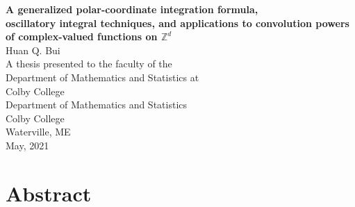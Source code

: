 \documentclass[11pt, letter]{book}
\begin{document}
\thispagestyle{empty}
\begin{center}
{\Large{\textbf{
A generalized polar-coordinate integration formula, \\
oscillatory integral techniques, and applications to convolution powers of complex-valued functions on $\mathbb{Z}^d$
}}}\\
\vspace{1cm}
{\large{Huan Q. Bui}}\\
\vspace{7cm}
A thesis presented to the faculty of the\\
Department of Mathematics and Statistics at\\
Colby College\\
\vspace{7cm}
Department of Mathematics and Statistics\\
Colby College\\
Waterville, ME\\
May, 2021
\end{center}


\newpage
\section*{Abstract} 


\end{document}
